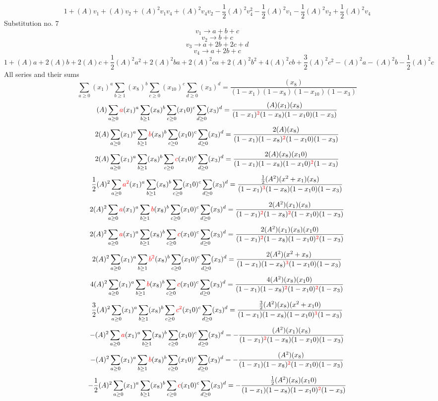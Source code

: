 \documentclass{article}
\begin{document}
\[1+(A)v_1+(A)v_2+(A)^2v_1v_4+(A)^2v_4v_2-\frac{1}{2}(A)^2v_4^{2}-\frac{1}{2}(A)^2v_1-\frac{1}{2}(A)^2v_2+\frac{1}{2}(A)^2v_4\]Substitution no. 7\[v_1\rightarrow{a+b+c}\]\[v_2\rightarrow{b+c}\]\[v_3\rightarrow{a+2b+2c+d}\]\[v_4\rightarrow{a+2b+c}\]\[1+(A)a+2(A)b+2(A)c+\frac{1}{2}(A)^2a^{2}+2(A)^2ba+2(A)^2ca+2(A)^2b^{2}+4(A)^2cb+\frac{3}{2}(A)^2c^{2}-(A)^2a-(A)^2b-\frac{1}{2}(A)^2c\]All series and their sums\[\sum_{a\geq{0}}(x_1)^{a}\sum_{b\geq{1}}(x_8)^{b}\sum_{c\geq{0}}(x_10)^{c}\sum_{d\geq{0}}(x_3)^{d}=\frac{(x_8)}{(1-x_1)(1-x_8)(1-x_10)(1-x_3)}\]\[(A)\sum_{a\geq{0}}\textcolor{red}{a}(x_1)^{a}\sum_{b\geq{1}}(x_8)^{b}\sum_{c\geq{0}}(x_10)^{c}\sum_{d\geq{0}}(x_3)^{d}=\frac{(A)(x_1)(x_8)}{(1-x_1)^{\textcolor{red}{2}}(1-x_8)(1-x_10)(1-x_3)}\]\[2(A)\sum_{a\geq{0}}(x_1)^{a}\sum_{b\geq{1}}\textcolor{red}{b}(x_8)^{b}\sum_{c\geq{0}}(x_10)^{c}\sum_{d\geq{0}}(x_3)^{d}=\frac{2(A)(x_8)}{(1-x_1)(1-x_8)^{\textcolor{red}{2}}(1-x_10)(1-x_3)}\]\[2(A)\sum_{a\geq{0}}(x_1)^{a}\sum_{b\geq{1}}(x_8)^{b}\sum_{c\geq{0}}\textcolor{red}{c}(x_10)^{c}\sum_{d\geq{0}}(x_3)^{d}=\frac{2(A)(x_8)(x_10)}{(1-x_1)(1-x_8)(1-x_10)^{\textcolor{red}{2}}(1-x_3)}\]\[\frac{1}{2}(A)^{2}\sum_{a\geq{0}}\textcolor{red}{a^{2}}(x_1)^{a}\sum_{b\geq{1}}(x_8)^{b}\sum_{c\geq{0}}(x_10)^{c}\sum_{d\geq{0}}(x_3)^{d}=\frac{\frac{1}{2}(A^{2})(x^{2}+x_1)(x_8)}{(1-x_1)^{\textcolor{red}{3}}(1-x_8)(1-x_10)(1-x_3)}\]\[2(A)^{2}\sum_{a\geq{0}}\textcolor{red}{a}(x_1)^{a}\sum_{b\geq{1}}\textcolor{red}{b}(x_8)^{b}\sum_{c\geq{0}}(x_10)^{c}\sum_{d\geq{0}}(x_3)^{d}=\frac{2(A^{2})(x_1)(x_8)}{(1-x_1)^{\textcolor{red}{2}}(1-x_8)^{\textcolor{red}{2}}(1-x_10)(1-x_3)}\]\[2(A)^{2}\sum_{a\geq{0}}\textcolor{red}{a}(x_1)^{a}\sum_{b\geq{1}}(x_8)^{b}\sum_{c\geq{0}}\textcolor{red}{c}(x_10)^{c}\sum_{d\geq{0}}(x_3)^{d}=\frac{2(A^{2})(x_1)(x_8)(x_10)}{(1-x_1)^{\textcolor{red}{2}}(1-x_8)(1-x_10)^{\textcolor{red}{2}}(1-x_3)}\]\[2(A)^{2}\sum_{a\geq{0}}(x_1)^{a}\sum_{b\geq{1}}\textcolor{red}{b^{2}}(x_8)^{b}\sum_{c\geq{0}}(x_10)^{c}\sum_{d\geq{0}}(x_3)^{d}=\frac{2(A^{2})(x^{2}+x_8)}{(1-x_1)(1-x_8)^{\textcolor{red}{3}}(1-x_10)(1-x_3)}\]\[4(A)^{2}\sum_{a\geq{0}}(x_1)^{a}\sum_{b\geq{1}}\textcolor{red}{b}(x_8)^{b}\sum_{c\geq{0}}\textcolor{red}{c}(x_10)^{c}\sum_{d\geq{0}}(x_3)^{d}=\frac{4(A^{2})(x_8)(x_10)}{(1-x_1)(1-x_8)^{\textcolor{red}{2}}(1-x_10)^{\textcolor{red}{2}}(1-x_3)}\]\[\frac{3}{2}(A)^{2}\sum_{a\geq{0}}(x_1)^{a}\sum_{b\geq{1}}(x_8)^{b}\sum_{c\geq{0}}\textcolor{red}{c^{2}}(x_10)^{c}\sum_{d\geq{0}}(x_3)^{d}=\frac{\frac{3}{2}(A^{2})(x_8)(x^{2}+x_10)}{(1-x_1)(1-x_8)(1-x_10)^{\textcolor{red}{3}}(1-x_3)}\]\[-(A)^{2}\sum_{a\geq{0}}\textcolor{red}{a}(x_1)^{a}\sum_{b\geq{1}}(x_8)^{b}\sum_{c\geq{0}}(x_10)^{c}\sum_{d\geq{0}}(x_3)^{d}=-\frac{(A^{2})(x_1)(x_8)}{(1-x_1)^{\textcolor{red}{2}}(1-x_8)(1-x_10)(1-x_3)}\]\[-(A)^{2}\sum_{a\geq{0}}(x_1)^{a}\sum_{b\geq{1}}\textcolor{red}{b}(x_8)^{b}\sum_{c\geq{0}}(x_10)^{c}\sum_{d\geq{0}}(x_3)^{d}=-\frac{(A^{2})(x_8)}{(1-x_1)(1-x_8)^{\textcolor{red}{2}}(1-x_10)(1-x_3)}\]\[-\frac{1}{2}(A)^{2}\sum_{a\geq{0}}(x_1)^{a}\sum_{b\geq{1}}(x_8)^{b}\sum_{c\geq{0}}\textcolor{red}{c}(x_10)^{c}\sum_{d\geq{0}}(x_3)^{d}=-\frac{\frac{1}{2}(A^{2})(x_8)(x_10)}{(1-x_1)(1-x_8)(1-x_10)^{\textcolor{red}{2}}(1-x_3)}\]
\end{document}
